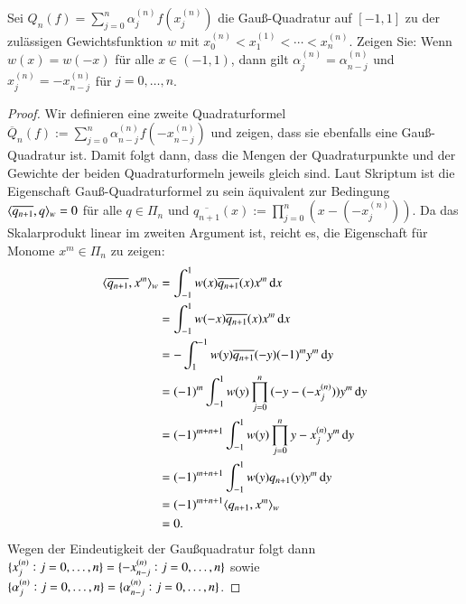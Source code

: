 
\begin{exercise}
  Sei $Q_n(f) = \sum_{j=0}^n{\alpha_j^{(n)}f(x_j^{(n)})}$ die Gauß-Quadratur auf $[-1,1]$ zu der zulässigen Gewichtsfunktion $w$ mit $x_0^{(n)}<x_1^{(1)}< \cdots <x_n^{(n)}$. Zeigen Sie: Wenn $w(x)=w(-x)$ für alle $x \in (-1,1)$, dann gilt $\alpha_j^{(n)}=\alpha_{n-j}^{(n)}$ und $x_j^{(n)}=-x_{n-j}^{(n)}$ für $j=0, \dots, n$.
\end{exercise}

\begin{proof}
  Wir definieren eine zweite Quadraturformel $\overline{Q}_n(f):=\sum_{j=0}^n{\alpha_{n-j}^{(n)} f(-x_{n-j}^{(n)})}$ und zeigen, dass sie ebenfalls eine Gauß-Quadratur ist.
  Damit folgt dann, dass die Mengen der Quadraturpunkte und der Gewichte der beiden Quadraturformeln jeweils gleich sind.
  Laut Skriptum ist die Eigenschaft Gauß-Quadraturformel zu sein äquivalent zur Bedingung $\langle {\overline{q_{n+1}}},{q} \rangle_w=0$ für alle $q \in \Pi_n$ und $\overline{q_{n+1}}(x):=\prod_{j=0}^n{(x-(-x_j^{(n)}))}$.
  Da das Skalarprodukt linear im zweiten Argument ist, reicht es, die Eigenschaft für Monome $x^m \in \Pi_n$ zu zeigen:
  \begin{equation*}
    \begin{split}
      \dotproduct{\overline{q_{n+1}}}{x^m}_w
      &= \int_{-1}^1{w(x)\overline{q_{n+1}}(x)x^m \dif x} \\
      &= \int_{-1}^1{w(-x)\overline{q_{n+1}}(x)x^m \dif x} \\
      &= -\int_1^{-1}{w(y)\overline{q_{n+1}}(-y){(-1)}^m y^m \dif y} \\
      &= {(-1)}^m \int_{-1}^1{w(y)\prod_{j=0}^n{(-y-(-x_j^{(n)}))}y^m \dif y} \\
      &= {(-1)}^{m+n+1} \int_{-1}^1{w(y)\prod_{j=0}^n{y-x_j^{(n)}} y^m \dif y} \\
      &= {(-1)}^{m+n+1} \int_{-1}^1{w(y)q_{n+1}(y) y^m\dif y} \\
      &= {(-1)}^{m+n+1} \dotproduct{q_{n+1}}{x^m}_w \\
      &= 0.
    \end{split}
  \end{equation*}
  Wegen der Eindeutigkeit der Gaußquadratur folgt dann
  $\{x_j^{(n)}:j=0,\dots,n\}=\{-x_{n-j}^{(n)}:j=0,\dots,n\}$
  sowie
  $\{\alpha_j^{(n)}:j=0,\dots,n\}=\{\alpha_{n-j}^{(n)}:j=0,\dots,n\}$.


\end{proof}
